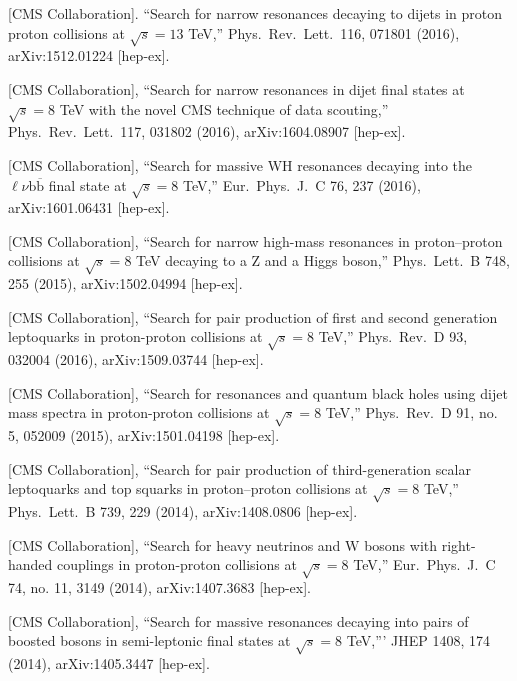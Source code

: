 \documentclass[10pt, a4paper]{article}
\begin{document}
\begin{thebibliography}{599}

  [CMS Collaboration].
  ``Search for narrow resonances decaying to 
  dijets in proton proton
  collisions at $\sqrt{s}=13$ TeV,''
  Phys.\ Rev.\ Lett.\  116, 071801 (2016), arXiv:1512.01224 [hep-ex].

[CMS Collaboration],
  ``Search for narrow resonances in dijet final states at $\sqrt{s}=8$
  TeV with the novel CMS technique of data scouting,''
  Phys.\ Rev.\ Lett.\  117, 031802 (2016), arXiv:1604.08907 [hep-ex].

[CMS Collaboration],
  ``Search for massive WH resonances decaying into the $\ell \nu \mathrm{b} \overline{\mathrm{b}} $ final state at $\sqrt{s}=8$ TeV,''
  Eur.\ Phys.\ J.\ C 76, 237 (2016), arXiv:1601.06431 [hep-ex].

 [CMS Collaboration],
  ``Search for narrow high-mass resonances in proton–proton collisions
  at $\sqrt{s}=8$ TeV decaying to a Z and a Higgs boson,''
  Phys.\ Lett.\ B 748, 255 (2015), arXiv:1502.04994 [hep-ex].

[CMS Collaboration],
  ``Search for pair production of first and second generation
  leptoquarks in proton-proton collisions at $\sqrt{s}=8$ TeV,''
  Phys.\ Rev.\ D  93, 032004 (2016), arXiv:1509.03744 [hep-ex].

  [CMS Collaboration],
  ``Search for resonances and quantum black holes using dijet mass
  spectra in proton-proton collisions at $\sqrt{s}=8$ TeV,''
  Phys.\ Rev.\ D 91, no. 5, 052009 (2015), arXiv:1501.04198 [hep-ex].

  [CMS Collaboration],
  ``Search for pair production of third-generation scalar leptoquarks
  and top squarks in proton–proton collisions at $\sqrt{s}=8$ TeV,''
  Phys.\ Lett.\ B 739, 229 (2014), arXiv:1408.0806 [hep-ex].

  [CMS Collaboration],
  ``Search for heavy neutrinos and $\mathrm {W}$ bosons with
  right-handed couplings in proton-proton collisions at $\sqrt{s}=8$ TeV,''
  Eur.\ Phys.\ J.\ C 74, no. 11, 3149 (2014), arXiv:1407.3683 [hep-ex].

  [CMS Collaboration],
  ``Search for massive resonances decaying into pairs of boosted
  bosons in semi-leptonic final states at $\sqrt{s}=8$ TeV,'''
  JHEP 1408, 174 (2014), arXiv:1405.3447 [hep-ex].




\end{thebibliography}
\end{document}
